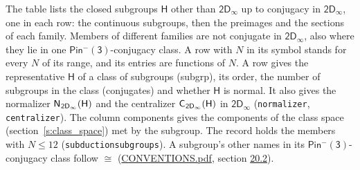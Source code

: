 \documentclass[10pt,a4paper]{article}
\numberwithin{equation}{section}
\newcommand{\grp}[1]{\mathsf{#1}}
\newcommand{\samecls}{\cong}
\newcommand{\hairsp}{\mkern1mu}
\begin{document}
\leavevmode\label{n:group.H}The table lists the closed subgroups $\grp{H}$ other than $\grp{2D_{\infty }}$ up to conjugacy in $\grp{2D_{\infty }}$, one in each row: the continuous subgroups, then the preimages and the sections of each family. Members of different families are not conjugate in $\grp{2D_{\infty }}$, also where they lie in one \href{Pinminus3.pdf}{$\grp{Pin^{-}(3)}$}-conjugacy class. A row with $N$ in its symbol stands for every $N$ of its range, and its entries are functions of $N$. \label{n:head.subgroup}\label{n:head.order}\label{n:head.conjugates}\label{n:head.normal}A row gives the representative $\grp{H}$ of a class of subgroups (subgrp), its order, the number of subgroups in the class (conjugates) and whether $\grp{H}$ is normal. \label{n:group.normalizer}\label{n:group.centralizer}It also gives the normalizer $\grp{N}_{\hairsp \grp{2D_{\infty }}}(\grp{H})$ and the centralizer $\grp{C}_{\hairsp \grp{2D_{\infty }}}(\grp{H})$ in $\grp{2D_{\infty }}$ (\texttt{normalizer}, \texttt{centralizer}). \label{n:head.components}The column components gives the components of the class space (section~\ref{s:class_space}) met by the subgroup. The record holds the members with $N \le 12$ (\texttt{subductionsubgroups}). A subgroup's other names in its \href{Pinminus3.pdf}{$\grp{Pin^{-}(3)}$}-conjugacy class follow $\samecls$ (\href{../../CONVENTIONS.pdf}{CONVENTIONS.pdf}, section \href{../../CONVENTIONS.pdf\#conv.20.2}{20.2}).
\end{document}
